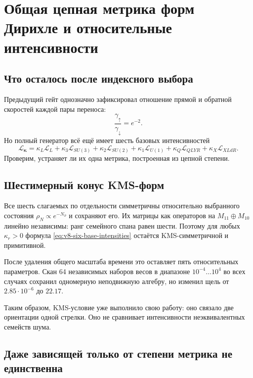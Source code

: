 \chapter{Общая цепная метрика форм Дирихле и относительные интенсивности}
\label{ch:v8-common-chain-dirichlet-rate-metric-gate}

\section{Что осталось после индексного выбора}

Предыдущий гейт однозначно зафиксировал отношение прямой и обратной
скоростей каждой пары переноса:
\begin{equation}
 \frac{\gamma_\uparrow}{\gamma_\downarrow}=e^{-2}.
\end{equation}
Но полный генератор всё ещё имеет шесть базовых интенсивностей
\begin{equation}
 \mathcal L_{\boldsymbol\kappa}
 =\kappa_L\mathcal L_L
 +\kappa_3\mathcal L_{SU(3)}
 +\kappa_2\mathcal L_{SU(2)}
 +\kappa_1\mathcal L_{U(1)}
 +\kappa_Q\mathcal L_{QLYR}
 +\kappa_X\mathcal L_{XLdR}.
 \label{eq:v8-six-base-intensities}
\end{equation}
Проверим, устраняет ли их одна метрика, построенная из цепной степени.

\section{Шестимерный конус KMS-форм}

Все шесть слагаемых по отдельности симметричны относительно выбранного
состояния $\rho_N\propto e^{-N_\partial}$ и сохраняют его. Их матрицы как
операторов на $M_{11}\oplus M_{10}$ линейно независимы: ранг семейного
спана равен шести. Поэтому для любых $\kappa_r>0$ формула
\eqref{eq:v8-six-base-intensities} остаётся KMS-симметричной и примитивной.

После удаления общего масштаба времени это оставляет пять относительных
параметров. Скан 64 независимых наборов весов в диапазоне
$10^{-4}\ldots10^4$ во всех случаях сохранил одномерную неподвижную
алгебру, но изменил щель от $2.85\cdot10^{-6}$ до $22.17$.

Таким образом, KMS-условие уже выполнило свою работу: оно связало две
ориентации одной стрелки. Оно не сравнивает интенсивности неэквивалентных
семейств шума.

\section{Даже зависящей только от степени метрика не единственна}

